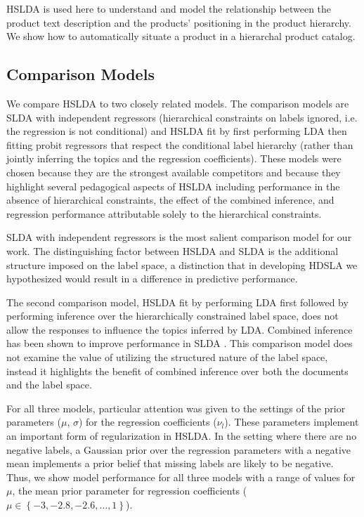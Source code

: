 HSLDA is used here to understand and model the relationship between the product text description and the products' positioning in the product hierarchy.  We show how to automatically situate a product in a hierarchal product catalog.  


\subsection{Comparison Models}

We compare HSLDA to two closely related models. The comparison models are SLDA with independent
regressors (hierarchical constraints on labels ignored,  i.e. the regression is not conditional) and HSLDA fit by first
performing LDA then fitting probit regressors that respect the conditional label hierarchy (rather than jointly inferring the topics and the regression coefficients). These models were
chosen because they are the strongest available competitors and because they  highlight several pedagogical aspects of HSLDA including performance in the
absence  of hierarchical constraints, the effect of the combined inference, and
regression performance attributable solely to the hierarchical constraints.

SLDA with independent regressors is the most salient comparison model
for our work. The distinguishing factor between HSLDA and SLDA is the
additional structure imposed on the label space, a distinction that in developing HDSLA we
hypothesized would result in a difference in predictive performance. 

 The second comparison model, HSLDA fit by performing LDA first
followed by performing inference over the hierarchically constrained label
space, does not allow
the responses to influence the topics inferred by LDA.
Combined inference has been shown to improve performance in SLDA
\cite{BleiMcAuliffe2008}. This comparison model does not examine the value of utilizing the structured nature 
of the label space, instead it highlights the benefit of combined inference over both the
documents and the label space. 


For all three models, particular attention was given to the settings of the 
prior parameters ($\mu$, $\sigma$) for the regression coefficients ($\nu_l$). These parameters implement an
important form of regularization in HSLDA. In the setting where there are no
negative labels, a Gaussian prior over the regression parameters with a
negative mean implements a prior belief that missing labels are likely to be
negative. Thus, we show model performance for all three models with a
range of values for $\mu$, the mean prior parameter for regression coefficients 
($\mu\in\left\{ -3,-2.8,-2.6,\ldots,1\right\}$).


